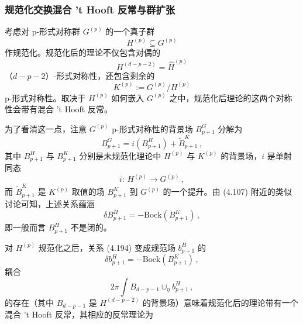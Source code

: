 

\subsubsection{规范化交换混合 't Hooft 反常与群扩张}

考虑对 p-形式对称群 $G^{(p)}$ 的一个真子群
\begin{equation}
  H^{(p)}\subseteq G^{(p)} \tag{4.189}
\end{equation}
作规范化。规范化后的理论不仅包含对偶的
\begin{equation}
  H^{(d-p-2)}=\hat{H}^{(p)} \tag{4.190}
\end{equation}
（$d-p-2$）-形式对称性，还包含剩余的
\begin{equation}
  K^{(p)}:=G^{(p)}/H^{(p)} \tag{4.191}
\end{equation}
p-形式对称性。取决于 $H^{(p)}$ 如何嵌入 $G^{(p)}$ 之中，规范化后理论的这两个对称性会带有混合 't Hooft 反常。

为了看清这一点，注意 $G^{(p)}$ p-形式对称性的背景场 $B^G_{p+1}$ 分解为
\begin{equation}
  B^G_{p+1}=i(B^H_{p+1})+\tilde{B}^K_{p+1}\,, \tag{4.192}
\end{equation}
其中 $B^H_{p+1}$ 与 $B^K_{p+1}$ 分别是未规范化理论中 $H^{(p)}$ 与 $K^{(p)}$ 的背景场，$i$ 是单射同态
\begin{equation}
  i:\,H^{(p)}\to G^{(p)}\,, \tag{4.193}
\end{equation}
而 $\tilde{B}^K_{p+1}$ 是 $K^{(p)}$ 取值的场 $B^K_{p+1}$ 到 $G^{(p)}$ 的一个提升。由 (4.107) 附近的类似讨论可知，上述关系蕴涵
\begin{equation}
  \delta B^H_{p+1}=-\mathrm{Bock}(B^K_{p+1})\,, \tag{4.194}
\end{equation}
即一般而言 $B^H_{p+1}$ 不是闭的。

对 $H^{(p)}$ 规范化之后，关系 (4.194) 变成规范场 $b^H_{p+1}$ 的
\begin{equation}
  \delta b^H_{p+1}=-\mathrm{Bock}(B^K_{p+1})\,, \tag{4.195}
\end{equation}
耦合
\begin{equation}
  2\pi\int B_{d-p-1}\cup_\eta b^H_{p+1}\,, \tag{4.196}
\end{equation}
的存在（其中 $B_{d-p-1}$ 是 $H^{(d-p-2)}$ 的背景场）意味着规范化后的理论带有一个混合 't Hooft 反常，其相应的反常理论为

